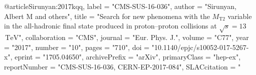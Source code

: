 

@article{Sirunyan:2017kqq,
      label          = "CMS-SUS-16-036",
      author         = "Sirunyan, Albert M and others",
      title          = "{Search for new phenomena with the $M_{\mathrm {T2}}$
                        variable in the all-hadronic final state produced in
                        proton--proton collisions at $\sqrt{s} = 13$ $\,\text
                        {TeV}$}",
      collaboration  = "CMS",
      journal        = "Eur. Phys. J.",
      volume         = "C77",
      year           = "2017",
      number         = "10",
      pages          = "710",
      doi            = "10.1140/epjc/s10052-017-5267-x",
      eprint         = "1705.04650",
      archivePrefix  = "arXiv",
      primaryClass   = "hep-ex",
      reportNumber   = "CMS-SUS-16-036, CERN-EP-2017-084",
      SLACcitation   = "%
}

